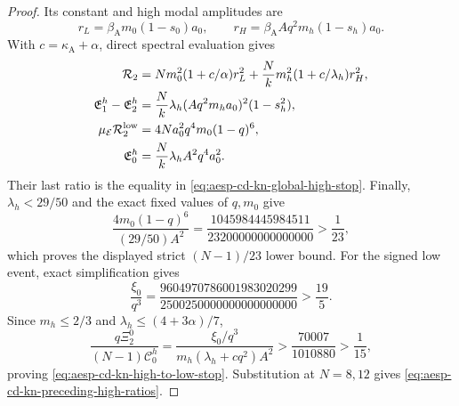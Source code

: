 \begin{proof}
Its constant and high modal amplitudes are
\begin{equation*}
 r_L=\beta_{\mathrm A}m_0(1-s_0)a_0,\qquad
 r_H=\beta_{\mathrm A}Aq^2m_h(1-s_h)a_0.
\end{equation*}
With $c=\kappa_{\mathrm A}+\alpha$, direct spectral evaluation gives
\begin{align*}
 \mathcal R_2
 &=Nm_0^2(1+c/\alpha)r_L^2
  +\frac Nk m_h^2(1+c/\lambda_h)r_H^2,\\
 \mathfrak E_1^h-\mathfrak E_2^h
 &=\frac Nk\lambda_h(Aq^2m_ha_0)^2(1-s_h^2),\\
 \mu_{\mathcal E}\mathcal R_2^{\rm low}
 &=4Na_0^2q^4m_0(1-q)^6,\\
 \mathfrak E_0^h
 &=\frac Nk\lambda_hA^2q^4a_0^2.
\end{align*}
Their last ratio is the equality in
\cref{eq:aesp-cd-kn-global-high-stop}.  Finally,
$\lambda_h<29/50$ and the exact fixed values of $q,m_0$ give
\[
 \frac{4m_0(1-q)^6}{(29/50)A^2}
 =\frac{1045984445984511}{23200000000000000}
 >\frac1{23},
\]
which proves the displayed strict $(N-1)/23$ lower bound.
For the signed low event, exact simplification gives
\begin{equation*}
 \frac{\xi_0}{q^3}
 =\frac{9604970786001983020299}{2500250000000000000000}
 >\frac{19}{5}.
\end{equation*}
Since $m_h\leq2/3$ and
$\lambda_h\leq(4+3\alpha)/7$,
\begin{equation*}
 \frac{q\Xi_2^0}{(N-1)\mathcal C_0^h}
 =\frac{\xi_0/q^3}{m_h(\lambda_h+cq^2)A^2}
 >\frac{70007}{1010880}>\frac1{15},
\end{equation*}
proving \cref{eq:aesp-cd-kn-high-to-low-stop}.
Substitution at $N=8,12$ gives
\cref{eq:aesp-cd-kn-preceding-high-ratios}.
\end{proof}


